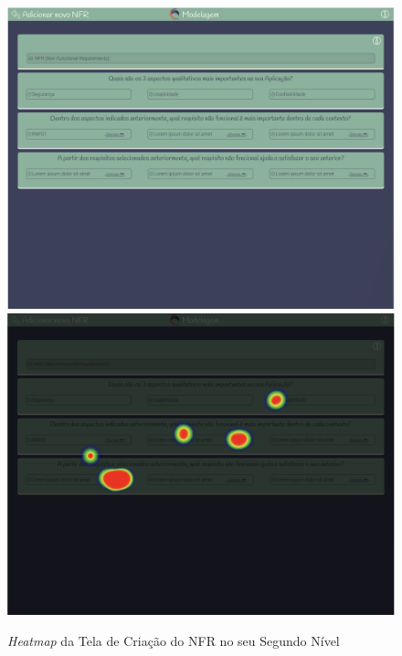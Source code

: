 \begin{figure}[]
  \begin{center}
      \caption{{\textit{Heatmap} da Tela de Criação do NFR no seu Segundo Nível}}
      \label{fig:nfr_hm_3}
      \includegraphics[scale=0.45]{figuras/UsabilityHub/nfr/5.png}
      \includegraphics[scale=0.45]{figuras/UsabilityHub/nfr/6.png}
  \end{center}
\end{figure}

